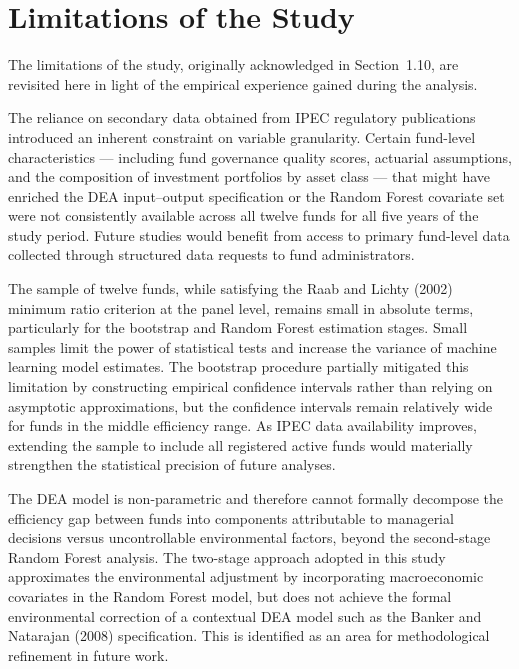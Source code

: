 \documentclass[12pt,a4paper]{article}
\begin{document}
\section{Limitations of the Study}

The limitations of the study, originally acknowledged in Section~1.10, are revisited here in light of the empirical experience gained during the analysis.

The reliance on secondary data obtained from IPEC regulatory publications introduced an inherent constraint on variable granularity. Certain fund-level characteristics --- including fund governance quality scores, actuarial assumptions, and the composition of investment portfolios by asset class --- that might have enriched the DEA input--output specification or the Random Forest covariate set were not consistently available across all twelve funds for all five years of the study period. Future studies would benefit from access to primary fund-level data collected through structured data requests to fund administrators.

The sample of twelve funds, while satisfying the Raab and Lichty (2002) minimum ratio criterion at the panel level, remains small in absolute terms, particularly for the bootstrap and Random Forest estimation stages. Small samples limit the power of statistical tests and increase the variance of machine learning model estimates. The bootstrap procedure partially mitigated this limitation by constructing empirical confidence intervals rather than relying on asymptotic approximations, but the confidence intervals remain relatively wide for funds in the middle efficiency range. As IPEC data availability improves, extending the sample to include all registered active funds would materially strengthen the statistical precision of future analyses.

The DEA model is non-parametric and therefore cannot formally decompose the efficiency gap between funds into components attributable to managerial decisions versus uncontrollable environmental factors, beyond the second-stage Random Forest analysis. The two-stage approach adopted in this study approximates the environmental adjustment by incorporating macroeconomic covariates in the Random Forest model, but does not achieve the formal environmental correction of a contextual DEA model such as the Banker and Natarajan (2008) specification. This is identified as an area for methodological refinement in future work.
\end{document}
